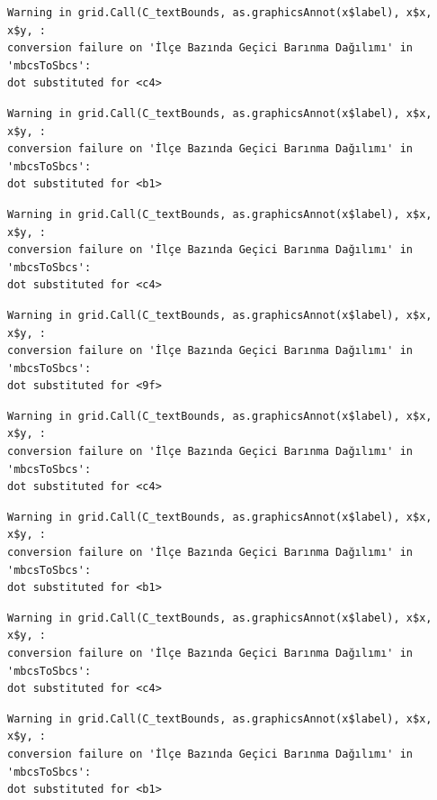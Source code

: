 \documentclass[
  11pt,
  a4paper,
  DIV=11,
  numbers=noendperiod]{scrartcl}
\begin{document}
\begin{verbatim}
Warning in grid.Call(C_textBounds, as.graphicsAnnot(x$label), x$x, x$y, :
conversion failure on 'İlçe Bazında Geçici Barınma Dağılımı' in 'mbcsToSbcs':
dot substituted for <c4>
\end{verbatim}

\begin{verbatim}
Warning in grid.Call(C_textBounds, as.graphicsAnnot(x$label), x$x, x$y, :
conversion failure on 'İlçe Bazında Geçici Barınma Dağılımı' in 'mbcsToSbcs':
dot substituted for <b1>
\end{verbatim}

\begin{verbatim}
Warning in grid.Call(C_textBounds, as.graphicsAnnot(x$label), x$x, x$y, :
conversion failure on 'İlçe Bazında Geçici Barınma Dağılımı' in 'mbcsToSbcs':
dot substituted for <c4>
\end{verbatim}

\begin{verbatim}
Warning in grid.Call(C_textBounds, as.graphicsAnnot(x$label), x$x, x$y, :
conversion failure on 'İlçe Bazında Geçici Barınma Dağılımı' in 'mbcsToSbcs':
dot substituted for <9f>
\end{verbatim}

\begin{verbatim}
Warning in grid.Call(C_textBounds, as.graphicsAnnot(x$label), x$x, x$y, :
conversion failure on 'İlçe Bazında Geçici Barınma Dağılımı' in 'mbcsToSbcs':
dot substituted for <c4>
\end{verbatim}

\begin{verbatim}
Warning in grid.Call(C_textBounds, as.graphicsAnnot(x$label), x$x, x$y, :
conversion failure on 'İlçe Bazında Geçici Barınma Dağılımı' in 'mbcsToSbcs':
dot substituted for <b1>
\end{verbatim}

\begin{verbatim}
Warning in grid.Call(C_textBounds, as.graphicsAnnot(x$label), x$x, x$y, :
conversion failure on 'İlçe Bazında Geçici Barınma Dağılımı' in 'mbcsToSbcs':
dot substituted for <c4>
\end{verbatim}

\begin{verbatim}
Warning in grid.Call(C_textBounds, as.graphicsAnnot(x$label), x$x, x$y, :
conversion failure on 'İlçe Bazında Geçici Barınma Dağılımı' in 'mbcsToSbcs':
dot substituted for <b1>
\end{verbatim}
\end{document}
